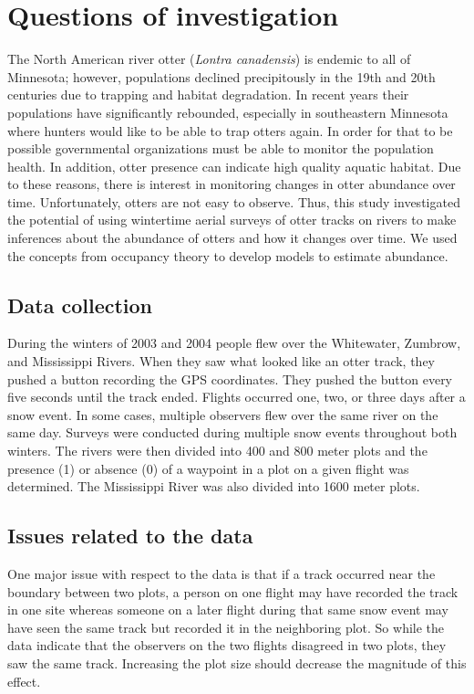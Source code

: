 \documentclass[12pt]{article}
\begin{document}
\section{Questions of investigation}
The North American river otter (\textit{Lontra canadensis}) is endemic to all of 
Minnesota; however, populations declined precipitously in the 19th and 20th 
centuries due to trapping and habitat degradation. In recent years their 
populations have significantly rebounded, especially in southeastern Minnesota 
where hunters would like to be able to trap otters again. In order for that to 
be possible governmental organizations must be able to monitor the population 
health. In addition, otter presence can indicate high quality aquatic habitat. 
Due to these reasons, there is interest in monitoring changes in otter abundance 
over time. Unfortunately, otters are not easy to observe. Thus, this study 
investigated the potential of using wintertime aerial surveys of otter tracks on 
rivers to make inferences about the abundance of otters and how it changes over 
time. We used the concepts from occupancy theory to develop models to estimate 
abundance.

\subsection{Data collection}
During the winters of 2003 and 2004 people flew over the Whitewater, Zumbrow, 
and Mississippi Rivers. When they saw what looked like an otter track, they 
pushed a button recording the GPS coordinates. They pushed the button every five 
seconds until the track ended. Flights occurred one, two, or three days after a 
snow event. In some cases, multiple observers flew over the same river on the 
same day. Surveys were conducted during multiple snow events throughout both 
winters. The rivers were then divided into 400 and 800 meter plots and the 
presence (1) or absence (0) of a waypoint in a plot on a given flight was 
determined. The Mississippi River was also divided into 1600 meter plots.

\subsection{Issues related to the data}
One major issue with respect to the data is that if a track occurred near the 
boundary between two plots, a person on one flight may have recorded the track 
in one site whereas someone on a later flight during that same snow event may 
have seen the same track but recorded it in the neighboring plot. So while the 
data indicate that the observers on the two flights disagreed in two plots, they 
saw the same track. Increasing the plot size should decrease the magnitude of 
this effect.
\end{document}
